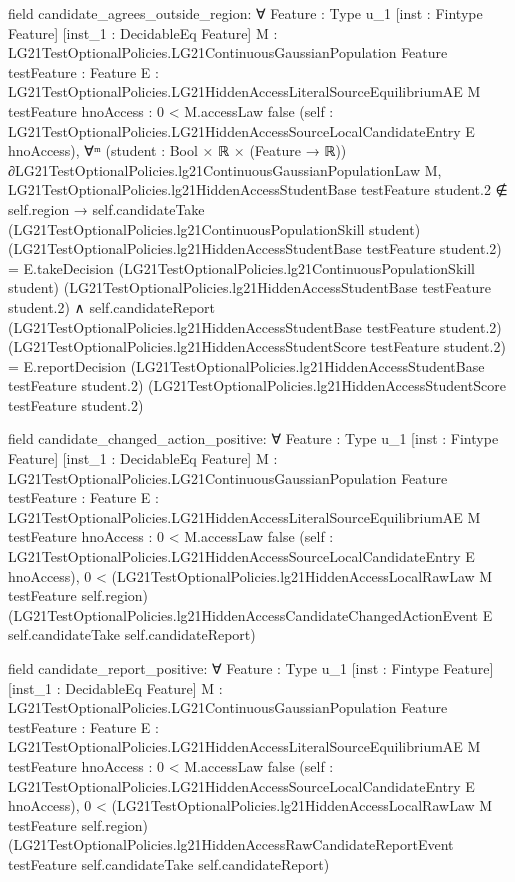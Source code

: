 \documentclass[10pt]{article}
\begin{document}
\begin{ReviewVerbatim}
field candidate_agrees_outside_region:
∀ {Feature : Type u_1} [inst : Fintype Feature] [inst_1 : DecidableEq Feature]
  {M : LG21TestOptionalPolicies.LG21ContinuousGaussianPopulation Feature} {testFeature : Feature}
  {E : LG21TestOptionalPolicies.LG21HiddenAccessLiteralSourceEquilibriumAE M testFeature}
  {hnoAccess : 0 < M.accessLaw {false}}
  (self : LG21TestOptionalPolicies.LG21HiddenAccessSourceLocalCandidateEntry E hnoAccess),
  ∀ᵐ (student : Bool × ℝ × (Feature → ℝ)) ∂LG21TestOptionalPolicies.lg21ContinuousGaussianPopulationLaw M,
    LG21TestOptionalPolicies.lg21HiddenAccessStudentBase testFeature student.2 ∉ self.region →
      self.candidateTake (LG21TestOptionalPolicies.lg21ContinuousPopulationSkill student)
            (LG21TestOptionalPolicies.lg21HiddenAccessStudentBase testFeature student.2) =
          E.takeDecision (LG21TestOptionalPolicies.lg21ContinuousPopulationSkill student)
            (LG21TestOptionalPolicies.lg21HiddenAccessStudentBase testFeature student.2) ∧
        self.candidateReport (LG21TestOptionalPolicies.lg21HiddenAccessStudentBase testFeature student.2)
            (LG21TestOptionalPolicies.lg21HiddenAccessStudentScore testFeature student.2) =
          E.reportDecision (LG21TestOptionalPolicies.lg21HiddenAccessStudentBase testFeature student.2)
            (LG21TestOptionalPolicies.lg21HiddenAccessStudentScore testFeature student.2)

field candidate_changed_action_positive:
∀ {Feature : Type u_1} [inst : Fintype Feature] [inst_1 : DecidableEq Feature]
  {M : LG21TestOptionalPolicies.LG21ContinuousGaussianPopulation Feature} {testFeature : Feature}
  {E : LG21TestOptionalPolicies.LG21HiddenAccessLiteralSourceEquilibriumAE M testFeature}
  {hnoAccess : 0 < M.accessLaw {false}}
  (self : LG21TestOptionalPolicies.LG21HiddenAccessSourceLocalCandidateEntry E hnoAccess),
  0 <
    (LG21TestOptionalPolicies.lg21HiddenAccessLocalRawLaw M testFeature self.region)
      (LG21TestOptionalPolicies.lg21HiddenAccessCandidateChangedActionEvent E self.candidateTake self.candidateReport)

field candidate_report_positive:
∀ {Feature : Type u_1} [inst : Fintype Feature] [inst_1 : DecidableEq Feature]
  {M : LG21TestOptionalPolicies.LG21ContinuousGaussianPopulation Feature} {testFeature : Feature}
  {E : LG21TestOptionalPolicies.LG21HiddenAccessLiteralSourceEquilibriumAE M testFeature}
  {hnoAccess : 0 < M.accessLaw {false}}
  (self : LG21TestOptionalPolicies.LG21HiddenAccessSourceLocalCandidateEntry E hnoAccess),
  0 <
    (LG21TestOptionalPolicies.lg21HiddenAccessLocalRawLaw M testFeature self.region)
      (LG21TestOptionalPolicies.lg21HiddenAccessRawCandidateReportEvent testFeature self.candidateTake
        self.candidateReport)


\end{ReviewVerbatim}
\end{document}
